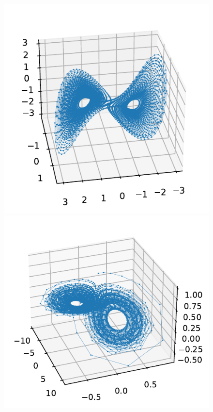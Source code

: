 \documentclass[pdf, hyperref={unicode}, aspectratio=169]{beamer}
\begin{document}
\begin{frame}
\begin{figure}
\includegraphics[height=0.38\textheight]{img/moore_spiegel}\hfill
\includegraphics[height=0.38\textheight]{img/vallis}


\end{figure}
\end{frame}
\end{document}

